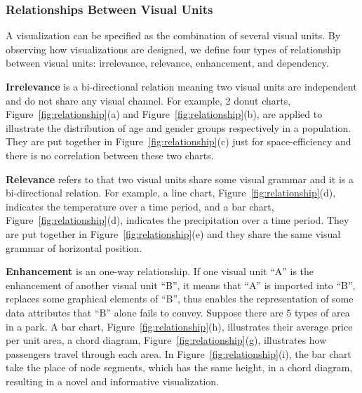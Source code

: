 \subsubsection{Relationships Between Visual Units}
A visualization can be specified as the combination of several visual units. 
By observing how visualizations are designed,
we define four types of relationship between visual units: irrelevance, relevance, enhancement, and dependency. 

\textbf{Irrelevance} is a bi-directional relation meaning two visual units are independent and do not share any visual channel.
For example, 2 donut charts, Figure~\ref{fig:relationship}(a) and Figure~\ref{fig:relationship}(b), are applied to illustrate the distribution of age and gender groups respectively in a population. They are put together in Figure~\ref{fig:relationship}(c) just for space-efficiency and there is no correlation between these two charts. 

\textbf{Relevance} refers to that two visual units share some visual grammar and it is a bi-directional relation. 
For example, a line chart, Figure~\ref{fig:relationship}(d), indicates the temperature over a time period, and a bar chart, Figure~\ref{fig:relationship}(d), indicates the precipitation over a time period. They are put together in Figure~\ref{fig:relationship}(e) and they share the same visual grammar of horizontal position.  


\textbf{Enhancement} is an one-way relationship. If one visual unit ``A'' is the enhancement of another visual unit ``B'', it means that ``A'' is imported into ``B'', replaces some graphical elements of ``B'', thus enables the representation of some data attributes that ``B'' alone fails to convey. Suppose there are 5 types of area in a park. A bar chart, Figure~\ref{fig:relationship}(h), illustrates their average price per unit area, a chord diagram, Figure~\ref{fig:relationship}(g), illustrates how passengers travel through each area. In Figure~\ref{fig:relationship}(i), the bar chart take the place of node segments, which has the same height, in a chord diagram, resulting in a novel and informative visualization.
 
